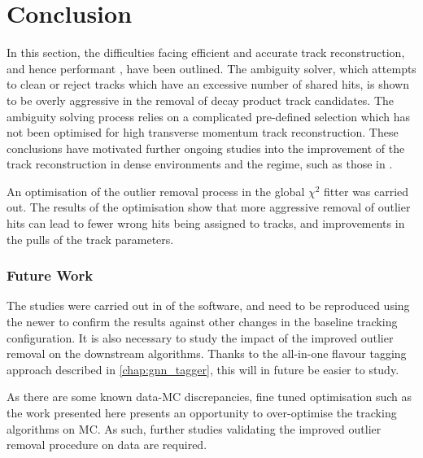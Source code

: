 



\section{Conclusion}

In this section, the difficulties facing efficient and accurate  track reconstruction, and hence performant \btagging, have been outlined.
The ambiguity solver, which attempts to clean or reject tracks which have an excessive number of shared hits, is shown to be overly aggressive in the removal of \bhadron decay product track candidates.
The ambiguity solving process relies on a complicated pre-defined selection which has not been optimised for high transverse momentum \bhadron track reconstruction.
These conclusions have motivated further ongoing studies into the improvement of the track reconstruction in dense environments and the \highpt regime, such as those in .

An optimisation of the outlier removal process in the global $\chi^2$ fitter was carried out.
The results of the optimisation show that more aggressive removal of outlier hits can lead to fewer wrong hits being assigned to tracks, and improvements in the pulls of the track parameters.


\subsubsection{Future Work}
The studies were carried out in \rtwoone of the \ATLAS software, and need to be reproduced using the newer \rtwotwo to confirm the results against other changes in the baseline tracking configuration.
It is also necessary to study the impact of the improved outlier removal on the downstream \btagging algorithms.
Thanks to the all-in-one flavour tagging approach described in \cref{chap:gnn_tagger}, this will in future be easier to study.

As there are some known data-MC discrepancies, fine tuned optimisation such as the work presented here presents an opportunity to over-optimise the tracking algorithms on MC.
As such, further studies validating the improved outlier removal procedure on data are required.
